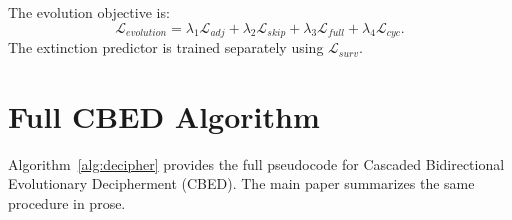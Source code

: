\documentclass{article}
\begin{document}
The evolution objective is:
\begin{equation}
\mathcal{L}_{evolution}
=
\lambda_1\mathcal{L}_{adj}
+
\lambda_2\mathcal{L}_{skip}
+
\lambda_3\mathcal{L}_{full}
+
\lambda_4\mathcal{L}_{cyc}.
\end{equation}
The extinction predictor is trained separately using $\mathcal{L}_{surv}$.


\section{Full CBED Algorithm}
\label{app:algorithm}

Algorithm~\ref{alg:decipher} provides the full pseudocode for Cascaded Bidirectional Evolutionary Decipherment (CBED). The main paper summarizes the same procedure in prose.
\end{document}
